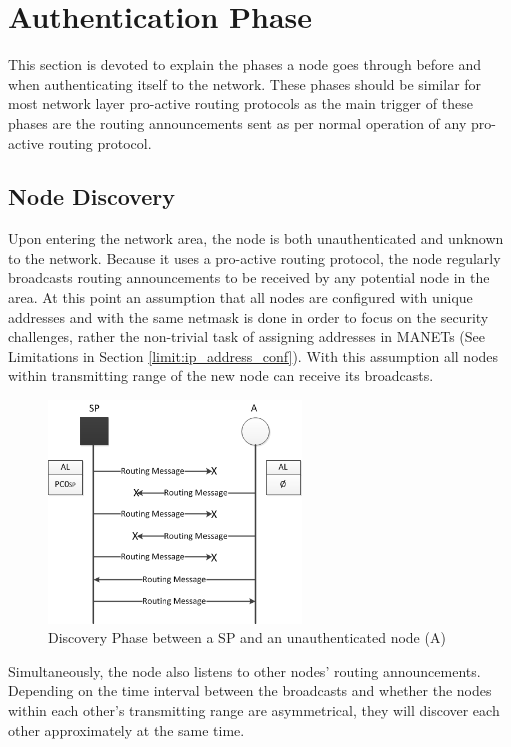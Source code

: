 \section{Authentication Phase}
This section is devoted to explain the phases a node goes through before and
when authenticating itself to the network. These phases should be similar for
most network layer pro-active routing protocols as the main trigger of these
phases are the routing announcements sent as per normal operation of any
pro-active routing protocol.

\subsection{Node Discovery}
Upon entering the network area, the node is both unauthenticated and unknown to
the network. Because it uses a pro-active routing protocol, the node regularly
broadcasts routing announcements to be received by any potential node in the
area. At this point an assumption that all nodes are configured with unique
addresses and with the same netmask is done in order to focus on the security
challenges, rather the non-trivial task of assigning addresses in \acp{MANET}
(See Limitations in Section \ref{limit:ip_address_conf}). With this assumption all
nodes within transmitting range of the new node can receive its broadcasts.

\begin{figure}[h]
	\centering
  	\includegraphics[width=0.6\textwidth]{images/node_states_discovery.png}
  	\caption{Discovery Phase between a \acf{SP} and an unauthenticated node (A)}
	\label{fig:node_states_discovery}
\end{figure}

Simultaneously, the node also listens to other nodes' routing announcements.
Depending on the time interval between the broadcasts and whether the nodes
within each other's transmitting range are asymmetrical, they will discover each
other approximately at the same time.


